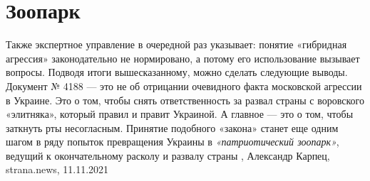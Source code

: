  
 
 
 
 
\chapter{Зоопарк}

Также экспертное управление в очередной раз указывает: понятие «гибридная
агрессия» законодательно не нормировано, а потому его использование вызывает
вопросы.  Подводя итоги вышесказанному, можно сделать следующие выводы.
Документ № 4188 — это не об отрицании очевидного факта московской агрессии в
Украине. Это о том, чтобы снять ответственность за развал страны с воровского
«элитняка», который правил и правит Украиной. А главное — это о том, чтобы
заткнуть рты несогласным. Принятие подобного «закона» станет еще одним шагом в
ряду попыток превращения Украины в \emph{«патриотический зоопарк»}, ведущий к
окончательному расколу и развалу страны
, 
Александр Карпец, strana.news, 11.11.2021
